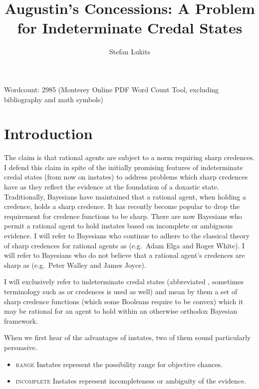 \documentclass[11pt]{article}
\begin{document}
\onehalfspacing

\title{Augustin's Concessions: A Problem for Indeterminate Credal States}
\author{Stefan Lukits}
\date{}
\maketitle

Wordcount: 2985 (Monterey Online PDF Word Count Tool, excluding
bibliography and math symbols)


\section{Introduction}
\label{Introduction}

The claim is that rational agents are subject to a norm requiring
sharp credences. I defend this claim in spite of the initially
promising features of indeterminate credal states (from now on
instates) to address problems which sharp credences have as they
reflect the evidence at the foundation of a doxastic state.
Traditionally, Bayesians have maintained that a rational agent, when
holding a credence, holds a sharp credence. It has recently become
popular to drop the requirement for credence functions to be sharp.
There are now Bayesians who permit a rational agent to hold instates
based on incomplete or ambiguous evidence. I will refer to Bayesians
who continue to adhere to the classical theory of sharp credences for
rational agents as  (e.g.\ Adam Elga and Roger
White). I will refer to Bayesians who do not believe that a rational
agent's credences are sharp as  (e.g.\ Peter Walley
and James Joyce).

I will exclusively refer to indeterminate credal states (abbreviated
, sometimes terminology such as  or
 credences is used as well) and mean by them a set of
sharp credence functions (which some Booleans require to be convex)
which it may be rational for an agent to hold within an otherwise
orthodox Bayesian framework.

When we first hear of the advantages of instates, two of them sound
particularly persuasive.

\begin{itemize}
\item \textsc{range} Instates represent the possibility range for
  objective chances.
\item \textsc{incomplete} Instates represent incompleteness or ambiguity
  of the evidence.
\end{itemize}
\end{document}
